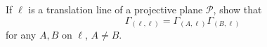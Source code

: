 If $\ell$ is a translation line of a projective plane $\mathcal{P}$, show that
$$\Gamma_{(\ell,\ell)} = \Gamma_{(A,\ell)} \Gamma_{(B,\ell)}$$
for any $A, B$ on $\ell$, $A \neq B$.
